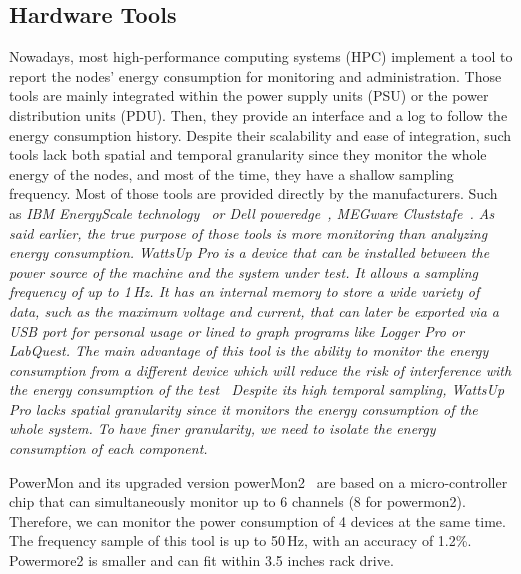 \subsection{Hardware Tools}
Nowadays, most high-performance computing systems (HPC) implement a tool to report the nodes' energy consumption for monitoring and administration.
Those tools are mainly integrated within the power supply units (PSU) or the power distribution units (PDU).
Then, they provide an interface and a log to follow the energy consumption history.
Despite their scalability and ease of integration, such tools lack both spatial and temporal granularity since they monitor the whole energy of the nodes, and most of the time, they have a shallow sampling frequency.
Most of those tools are provided directly by the manufacturers.
Such as \em{IBM EnergyScale technology}~\cite{mccreary2007energyscale,caldeira2014ibm,caldeiraibm} or \em{Dell poweredge}~\cite{lovicott2009thermal}, MEGware Cluststafe~\cite{breitbart2015case}.
As said earlier, the true purpose of those tools is more monitoring than analyzing energy consumption.
WattsUp Pro is a device that can be installed between the power source of the machine and the system under test.
It allows a sampling frequency of up to 1\,Hz. It has an internal memory to store a wide variety of data, such as the maximum voltage and current, that can later be exported via a USB port for personal usage or lined to graph programs like Logger Pro or LabQuest.
The main advantage of this tool is the ability to monitor the energy consumption from a different device which will reduce the risk of interference with the energy consumption of the test~\cite{hirst2013watts}
Despite its high temporal sampling, WattsUp Pro lacks spatial granularity since it monitors the energy consumption of the whole system.
To have finer granularity, we need to isolate the energy consumption of each component.



PowerMon and its upgraded version powerMon2~\cite{bedard2010powermon} are based on a micro-controller chip that can simultaneously monitor up to 6 channels (8 for powermon2).
Therefore, we can monitor the power consumption of 4 devices at the same time.
The frequency sample of this tool is up to 50\,Hz, with an accuracy of 1.2\%.
Powermore2 is smaller and can fit within 3.5 inches rack drive.

